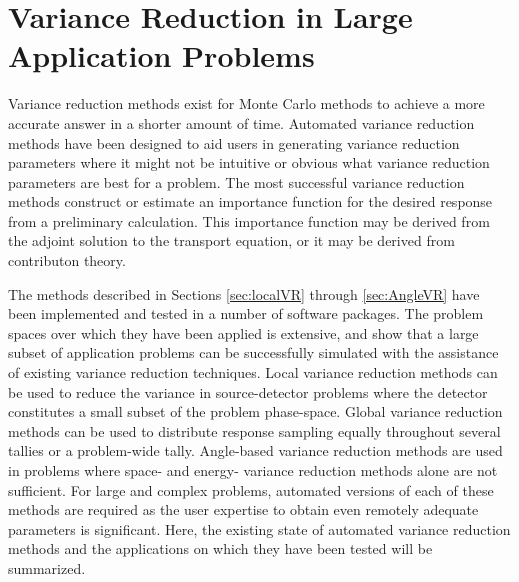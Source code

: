 \section{Variance Reduction in Large Application Problems}
\label{sec:litsummary}

Variance reduction methods exist for Monte Carlo methods to
achieve a more accurate answer in a
shorter amount of time. Automated variance reduction methods have been designed
to aid users in generating variance reduction parameters where it might not be
intuitive or obvious what variance reduction parameters are best for a problem.
The most successful variance reduction methods construct or estimate an
importance function for the desired response from a preliminary calculation.
This importance function may be derived from the adjoint solution to the
transport equation, or it may be derived from contributon theory.

The methods described in Sections \ref{sec:localVR} through \ref{sec:AngleVR}
have been implemented and tested in a number of software packages. The problem
spaces over which they have been applied is extensive, and show that a large
subset of application problems can be successfully simulated with the assistance
of existing variance reduction techniques. Local variance reduction methods can
be used to reduce the variance in source-detector problems where the detector
constitutes a small subset of the problem phase-space. Global variance reduction
methods can be used to distribute response sampling equally throughout several
tallies
or a problem-wide tally. Angle-based variance reduction methods are used in
problems where space- and energy- variance reduction methods alone are not
sufficient. For large and complex problems, automated versions of each of these
methods are required as the user expertise to obtain even remotely adequate
parameters is significant. Here, the existing state of automated variance
reduction methods and the applications on which they have been tested will be
summarized.

